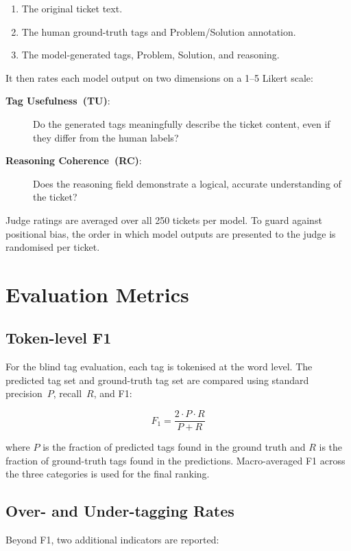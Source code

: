 \begin{enumerate}
    \item The original ticket text.
    \item The human ground-truth tags and Problem/Solution annotation.
    \item The model-generated tags, Problem, Solution, and reasoning.
\end{enumerate}

It then rates each model output on two dimensions on a 1--5 Likert scale:

\begin{description}
    \item[\textbf{Tag Usefulness~(TU)}:] Do the generated tags meaningfully
          describe the ticket content, even if they differ from the human
          labels?
    \item[\textbf{Reasoning Coherence~(RC)}:] Does the reasoning field
          demonstrate a logical, accurate understanding of the ticket?
\end{description}

Judge ratings are averaged over all 250 tickets per model.  To guard against
positional bias, the order in which model outputs are presented to the judge
is randomised per ticket.

\section{Evaluation Metrics}
\label{sec:metrics}
%
\subsection{Token-level F1}
%
For the blind tag evaluation, each tag is tokenised at the word level.  The
predicted tag set and ground-truth tag set are compared using standard
precision~$P$, recall~$R$, and F1:

\begin{equation}
    F_1 = \frac{2 \cdot P \cdot R}{P + R}
\end{equation}

where $P$ is the fraction of predicted tags found in the ground truth and $R$
is the fraction of ground-truth tags found in the predictions.  Macro-averaged
F1 across the three categories is used for the final ranking.

\subsection{Over- and Under-tagging Rates}
%
Beyond F1, two additional indicators are reported:

